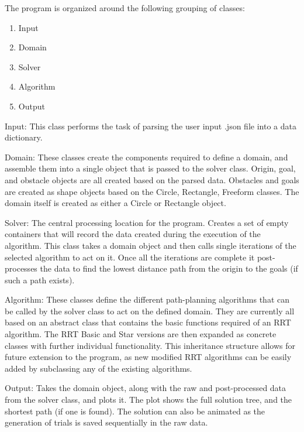 \documentclass[10pt]{article}
\begin{document}
	The program is organized around the following grouping of classes:
	
	\begin{enumerate}
		\item Input
		\item Domain 
		\item Solver
		\item Algorithm
		\item Output
	\end{enumerate}	

	Input: This class performs the task of parsing the user input .json file into a data dictionary.
	
	Domain: These classes create the components required to define a domain, and assemble them into a single object that is passed to the solver class. Origin, goal, and obstacle objects are all created based on the parsed data. Obstacles and goals are created as shape objects based on the Circle, Rectangle, Freeform classes. The domain itself is created as either a Circle or Rectangle object.
	
	Solver: The central processing location for the program. Creates a set of empty containers that will record the data created during the execution of the algorithm. This class takes a domain object and then calls single iterations of the selected algorithm to act on it. Once all the iterations are complete it post-processes the data to find the lowest distance path from the origin to the goals (if such a path exists).
	
	Algorithm: These classes define the different path-planning algorithms that can be called by the solver class to act on the defined domain. They are currently all based on an abstract class that contains the basic functions required of an RRT algorithm. The RRT Basic and Star versions are then expanded as concrete classes with further individual functionality. This inheritance structure allows for future extension to the program, as new modified RRT algorithms can be easily added by subclassing any of the existing algorithms.
	
	Output: Takes the domain object, along with the raw and post-processed data from the solver class, and plots it. The plot shows the full solution tree, and the shortest path (if one is found). The solution can also be animated as the generation of trials is saved sequentially in the raw data.
	
	
	
\end{document}
